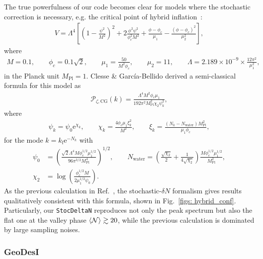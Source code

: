 \documentclass[aps, prd
, preprint
, nofootinbib 
, longbibliography
]{revtex4-1}
\newcommand{\ee}{\mathrm{e}}
\newcommand{\Mpl}{M_\text{Pl}}
\newcommand{\uf}{\text{f}}
\newcommand{\calN}{\mathcal{N}}
\newcommand{\calP}{\mathcal{P}}
\newcommand{\bae}[1]{\begin{align} #1 \end{align}}
\begin{document}
The true powerfulness of our code becomes clear for models where the stochastic correction is necessary, e.g. the critical point of hybrid inflation~\cite{Kawasaki:2015ppx}:
\bae{\label{eq: hybrid V}
	V=\Lambda^4\left[\left(1-\frac{\psi^2}{M^2}\right)^2+2\frac{\phi^2\psi^2}{\phi_c^2M^2}+\frac{\phi-\phi_c}{\mu_1}-\frac{(\phi-\phi_c)^2}{\mu_2^2}\right],
}
where
\bae{
	M=0.1, \qquad \phi_c=0.1\sqrt{2}, \qquad \mu_1=\frac{50}{M^2\phi_c}, \qquad \mu_2=11, \qquad \Lambda=2.189\times10^{-9}\times\frac{12\pi^2}{\mu_1^2},
}
in the Planck unit $\Mpl=1$. Clesse \& Garc\'ia-Bellido derived a semi-classical formula for this model as~\cite{Clesse:2015wea}
\bae{\label{eq: CG formula}
	\calP_{\zeta,\text{CG}}(k)=\frac{\Lambda^4M^2\phi_c\mu_1}{192\pi^2\Mpl^2\chi_2\psi_k^2},
}
where
\bae{
	\psi_k=\psi_0\ee^{\chi_k}, \qquad \chi_k=\frac{4\phi_c\mu_1\xi_k^2}{M^2}, \qquad \xi_k=\frac{(N_k-N_\text{water})\Mpl^2}{\mu_1\phi_c},
}
for the mode $k=k_\uf\ee^{-N_k}$ with
\bae{
	\psi_0&=\left(\frac{\sqrt{2}\Lambda^4M\phi_c^{1/2}\mu_1^{1/2}}{96\pi^{3/2}\Mpl^4}\right)^{1/2}, \qquad 
	N_\text{water}=\left(\frac{\sqrt{\chi_2}}{2}+\frac{1}{4\sqrt{\chi_2}}\right)\frac{M\phi_c^{1/2}\mu_1^{1/2}}{\Mpl^2}, \nonumber \\
	\chi_2&=\log\left(\frac{\phi_c^{1/2}M}{2\mu_1^{1/2}\psi_0}\right).
}
As the previous calculation in Ref.~\cite{Kawasaki:2015ppx}, the stochastic-$\delta N$ formalism gives results qualitatively consistent with this formula, 
shown in Fig.~\ref{figs: hybrid_conf}. Particularly, our \texttt{StocDeltaN} reproduces not only the peak spectrum but also the flat one at the valley phase 
$\braket{\calN}\gtrsim20$, while the previous calculation is dominated by large sampling noises.






\subsubsection{GeoDesI}


















\end{document}
